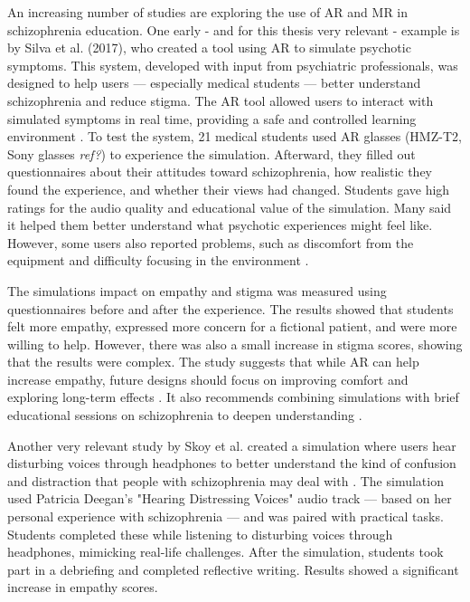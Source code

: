 An increasing number of studies are exploring the use of AR and MR in schizophrenia education. One early - and for this thesis very relevant - example is by Silva et al. (2017), who created a tool using AR to simulate psychotic symptoms. This system, developed with input from psychiatric professionals, was designed to help users — especially medical students — better understand schizophrenia and reduce stigma. The AR tool allowed users to interact with simulated symptoms in real time, providing a safe and controlled learning environment \cite{Silva2017}. To test the system, 21 medical students used AR glasses (HMZ-T2, Sony glasses \emph{ref?}) to experience the simulation. Afterward, they filled out questionnaires about their attitudes toward schizophrenia, how realistic they found the experience, and whether their views had changed. Students gave high ratings for the audio quality and educational value of the simulation. Many said it helped them better understand what psychotic experiences might feel like. However, some users also reported problems, such as discomfort from the equipment and difficulty focusing in the environment \cite{Silva2017}.

The simulations impact on empathy and stigma was measured using questionnaires before and after the experience. The results showed that students felt more empathy, expressed more concern for a fictional patient, and were more willing to help. However, there was also a small increase in stigma scores, showing that the results were complex. The study suggests that while AR can help increase empathy, future designs should focus on improving comfort and exploring long-term effects \cite{Silva2017}. It also recommends combining simulations with brief educational sessions on schizophrenia to deepen understanding \cite{Silva2017}. 

Another very relevant study by Skoy et al. created a simulation where users hear disturbing voices through headphones to better understand the kind of confusion and distraction that people with schizophrenia may deal with \cite{Skoy2016}. The simulation used Patricia Deegan's "Hearing Distressing Voices" audio track — based on her personal experience with schizophrenia — and was paired with practical tasks. Students completed these while listening to disturbing voices through headphones, mimicking real-life challenges. After the simulation, students took part in a debriefing and completed reflective writing. Results showed a significant increase in empathy scores.


